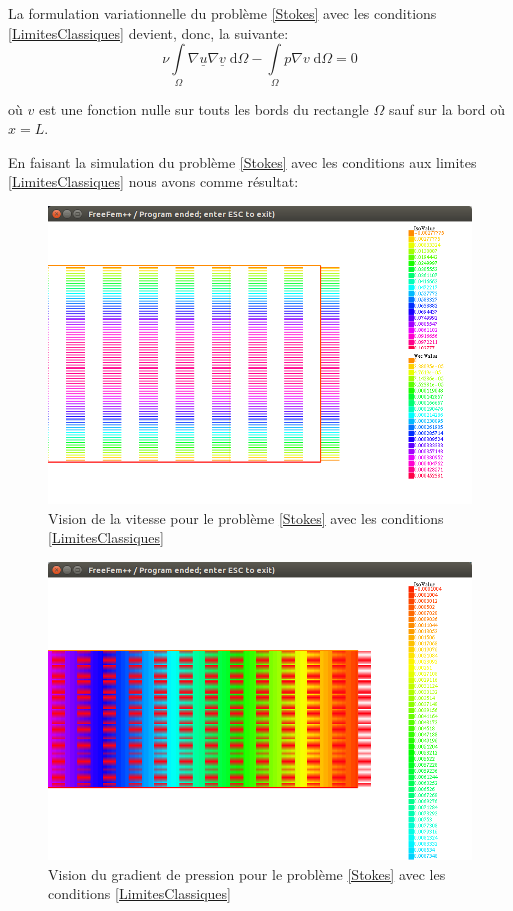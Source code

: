 \documentclass[11pt,a4paper]{article}
\begin{document}
La formulation variationnelle du problème \ref{Stokes} avec les conditions \ref{LimitesClassiques} devient, donc, la suivante:
\begin{equation}
\nu \int\limits_\Omega \nabla \underline{u} \nabla \underline{v} \;\mathrm{d}\Omega - \int\limits_\Omega p\nabla v \; \mathrm{d}\Omega = 0
\end{equation}

où $v$ est une fonction nulle sur touts les bords du rectangle $\Omega$ sauf sur la bord où $x = L$.

En faisant la simulation du problème \ref{Stokes} avec les conditions aux limites \ref{LimitesClassiques} nous avons comme résultat:
\begin{figure}[h]
\centering
\includegraphics[scale=0.4]{StokesConditionsClassiques.png}
\caption{Vision de la vitesse pour le problème \ref{Stokes} avec les conditions \ref{LimitesClassiques}}
\end{figure}

\begin{figure}[h]
\centering
\includegraphics[scale=0.4]{StokesConditionsClassiquesPression.png}
\caption{Vision du gradient de pression pour le problème \ref{Stokes} avec les conditions \ref{LimitesClassiques}}
\end{figure}
\end{document}
